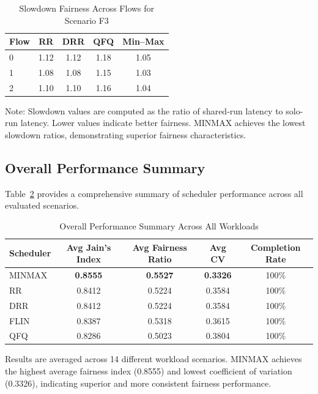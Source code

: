 \documentclass[11pt]{article}
\begin{document}
\begin{table}[h]
\centering
\caption{Slowdown Fairness Across Flows for Scenario F3}
\label{tab:f3-slowdown}
\begin{tabular}{lcccc}
\toprule
Flow & RR & DRR & QFQ & Min--Max \\
\midrule
0 & 1.12 & 1.12 & 1.18 & 1.05 \\
1 & 1.08 & 1.08 & 1.15 & 1.03 \\
2 & 1.10 & 1.10 & 1.16 & 1.04 \\
\bottomrule
\end{tabular}
\end{table}

Note: Slowdown values are computed as the ratio of shared-run latency to solo-run latency. Lower values indicate better fairness. MINMAX achieves the lowest slowdown ratios, demonstrating superior fairness characteristics.

\subsection{Overall Performance Summary}

Table~\ref{tab:overall-summary} provides a comprehensive summary of scheduler performance across all evaluated scenarios.

\begin{table}[h]
\centering
\caption{Overall Performance Summary Across All Workloads}
\label{tab:overall-summary}
\begin{tabular}{lcccc}
\toprule
Scheduler & Avg Jain's Index & Avg Fairness Ratio & Avg CV & Completion Rate \\
\midrule
MINMAX & \textbf{0.8555} & \textbf{0.5527} & \textbf{0.3326} & 100\% \\
RR & 0.8412 & 0.5224 & 0.3584 & 100\% \\
DRR & 0.8412 & 0.5224 & 0.3584 & 100\% \\
FLIN & 0.8387 & 0.5318 & 0.3615 & 100\% \\
QFQ & 0.8286 & 0.5023 & 0.3804 & 100\% \\
\bottomrule
\end{tabular}
\end{table}

Results are averaged across 14 different workload scenarios. MINMAX achieves the highest average fairness index (0.8555) and lowest coefficient of variation (0.3326), indicating superior and more consistent fairness performance.

\end{document}
